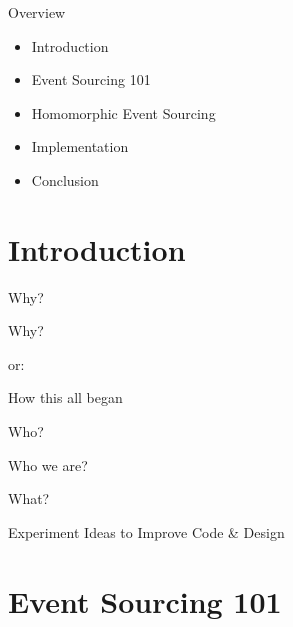 \begin{frame}[fragile]{Overview}

\begin{itemize}
\item Introduction
\item Event Sourcing 101
\item Homomorphic Event Sourcing
\item Implementation
\item Conclusion
\end{itemize}

\end{frame}

\section{Introduction}

\begin{frame}[fragile]{Why?}

\begin{center}
{
\LARGE
Why?
}

\vspace{2em}

or:

\vspace{2em}

{
\Large
How this all began
}
\end{center}
\end{frame}


\begin{frame}[fragile]{Who?}

\begin{center}
{
\LARGE
Who we are?
}

\vspace{2em}
\end{center}
\end{frame}


\begin{frame}[fragile]{What?}

\begin{center}
{
\LARGE
Experiment Ideas to Improve Code \& Design
}

\vspace{2em}
\end{center}
\end{frame}

\section{Event Sourcing 101}

